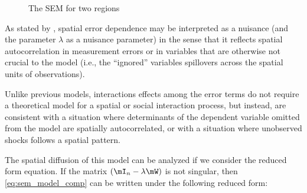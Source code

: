 \documentclass[english,12pt]{book}\usepackage[]{graphicx}\usepackage[]{xcolor}
\begin{document}
\begin{figure}[ht]
	\centering
	\caption{The SEM for two regions}\label{figure:sem}	
\end{figure}

As stated by \cite{AnselinBera1998}, spatial error dependence may be interpreted as a nuisance (and the parameter $\lambda$ as a nuisance parameter) in the sense that it reflects spatial autocorrelation in measurement errors or in variables that are otherwise not crucial to the model (i.e., the ``ignored'' variables spillovers across the spatial units of observations). 

Unlike previous models, interactions effects among the error terms do not require a theoretical model for a spatial or social interaction process, but instead, are consistent with a situation where determinants of the dependent variable omitted from the model are spatially autocorrelated, or with a situation where unobserved shocks follows a spatial pattern. 

The spatial diffusion of this model can be analyzed if we consider the reduced form equation. If the matrix $(\mI_n - \lambda\mW)$ is not singular, then \eqref{eq:sem_model_comp} can be written under the following reduced form:
\end{document}
